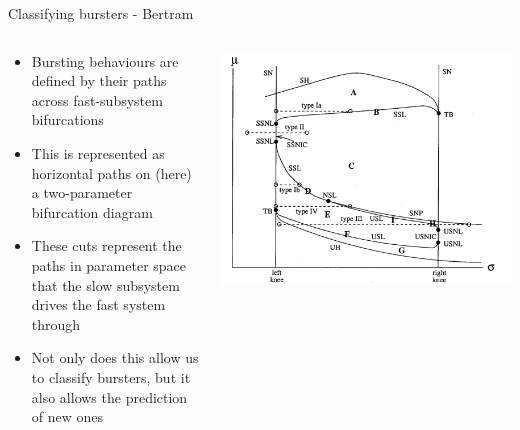\documentclass[,aspectratio=169]{beamer}
\begin{document}
\begin{frame}[label={sec:org42aab74}]{Classifying bursters - Bertram}
\begin{columns}
\begin{column}{0.5\columnwidth}
\begin{itemize}
\item Bursting behaviours are defined by their paths across fast-subsystem bifurcations
\item This is represented as horizontal paths on (here) a two-parameter bifurcation diagram
\item These cuts represent the paths in parameter space that the slow subsystem drives the fast system through
\item Not only does this allow us to classify bursters, but it also allows the prediction of new ones
\end{itemize}
\end{column}

\begin{column}{0.5\columnwidth}
\begin{center}
\includegraphics[height=.8\textheight]{bertrambif.png}
\end{center}
\end{column}
\end{columns}
\end{frame}
\end{document}
